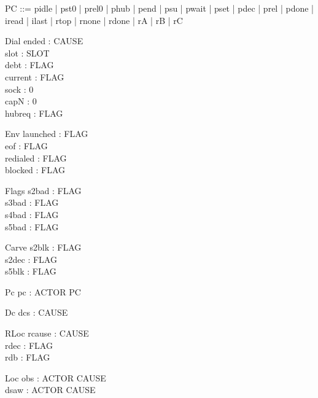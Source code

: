 \documentclass[a4paper,10pt,fleqn]{article}
\begin{document}
\begin{zed}
  PC ::= pidle | pst0 | prel0 | phub | pend | psu | pwait | pset | pdec | prel |
    pdone | iread | ilast | rtop | rnone | rdone | rA | rB | rC
\end{zed}

\begin{schema}{Dial}
  ended : CAUSE \\
  slot : SLOT \\
  debt : FLAG \\
  current : FLAG \\
  sock : 0  \\
  capN : 0  \\
  hubreq : FLAG
\end{schema}

\begin{schema}{Env}
  launched : FLAG \\
  eof : FLAG \\
  redialed : FLAG \\
  blocked : FLAG
\end{schema}

\begin{schema}{Flags}
  s2bad : FLAG \\
  s3bad : FLAG \\
  s4bad : FLAG \\
  s5bad : FLAG
\end{schema}

\begin{schema}{Carve}
  s2blk : FLAG \\
  s2dec : FLAG \\
  s5blk : FLAG
\end{schema}

\begin{schema}{Pc}
  pc : ACTOR \fun PC
\end{schema}

\begin{schema}{Dc}
  dcs : CAUSE
\end{schema}

\begin{schema}{RLoc}
  rcause : CAUSE \\
  rdec : FLAG \\
  rdb : FLAG
\end{schema}

\begin{schema}{Loc}
  obs : ACTOR \fun CAUSE \\
  dsaw : ACTOR \fun CAUSE
\end{schema}
\end{document}
